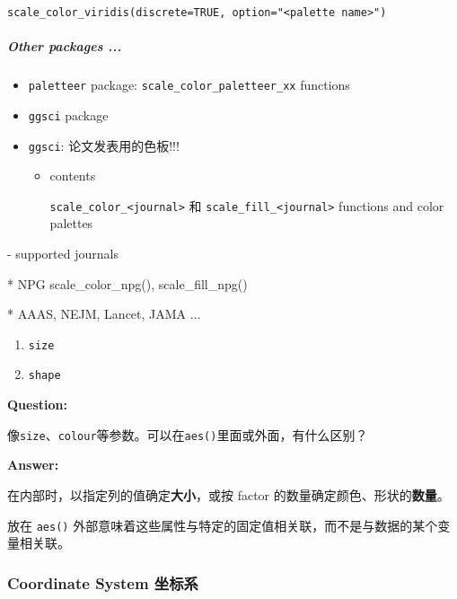 \documentclass[
]{article}
\newenvironment{Shaded}{}{}
\newcommand{\NormalTok}[1]{#1}
\begin{document}
\texttt{scale\_color\_viridis(discrete=TRUE,\ option="\textless{}palette\ name\textgreater{}")}

\hypertarget{other-packages-}{%
\subparagraph{Other packages ...}\label{other-packages-}}

\begin{itemize}
\item
  \texttt{paletteer} package: \texttt{scale\_color\_paletteer\_xx}
  functions
\item
  \texttt{ggsci} package
\item
  \texttt{ggsci}: 论文发表用的色板!!!

  \begin{itemize}
  \item
    contents

    \texttt{scale\_color\_\textless{}journal\textgreater{}} 和
    \texttt{scale\_fill\_\textless{}journal\textgreater{}} functions and
    color palettes
  \end{itemize}
\end{itemize}

\begin{Shaded}
\begin{Highlighting}[]
\NormalTok{{-} supported journals}

\NormalTok{	* NPG \textasciigrave{}scale\_color\_npg()\textasciigrave{}, \textasciigrave{}scale\_fill\_npg()\textasciigrave{}}

\NormalTok{	* AAAS, NEJM, Lancet, JAMA ... }
\end{Highlighting}
\end{Shaded}

\begin{enumerate}
\def\labelenumi{\arabic{enumi}.}
\item
  \texttt{size}
\item
  \texttt{shape}
\end{enumerate}

\textbf{Question:}

像\texttt{size}、\texttt{colour}等参数。可以在\texttt{aes()}里面或外面，有什么区别？

\textbf{Answer:}

在内部时，以指定列的值确定\textbf{大小}，或按 factor
的数量确定颜色、形状的\textbf{数量}。

放在 \texttt{aes()}
外部意味着这些属性与特定的固定值相关联，而不是与数据的某个变量相关联。

\hypertarget{coordinate-system-ux5750ux6807ux7cfb}{%
\subsubsection{Coordinate System
坐标系}\label{coordinate-system-ux5750ux6807ux7cfb}}
\end{document}
